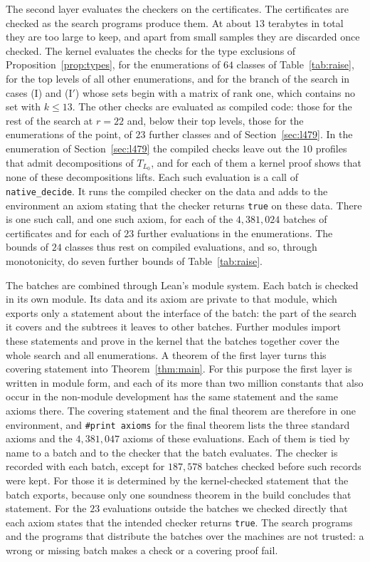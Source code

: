 \documentclass[11pt]{amsart}
\theoremstyle{definition}
\theoremstyle{remark}
\numberwithin{equation}{section}
\begin{document}
The second layer evaluates the checkers on the certificates. The certificates are checked as the search programs produce them. At about $13$ terabytes in total they are too large to keep, and apart from small samples they are discarded once checked. The kernel evaluates the checks for the type exclusions of Proposition~\ref{prop:types}, for the enumerations of $64$ classes of Table~\ref{tab:raise}, for the top levels of all other enumerations, and for the branch of the search in cases (I) and (I$'$) whose sets begin with a matrix of rank one, which contains no set with $k\le 13$. The other checks are evaluated as compiled code: those for the rest of the search at $r=22$ and, below their top levels, those for the enumerations of the point, of $23$ further classes and of Section~\ref{sec:l479}. In the enumeration of Section~\ref{sec:l479} the compiled checks leave out the $10$ profiles that admit decompositions of $T_{L_0}$, and for each of them a kernel proof shows that none of these decompositions lifts. Each such evaluation is a call of \texttt{native\_decide}. It runs the compiled checker on the data and adds to the environment an axiom stating that the checker returns \texttt{true} on these data. There is one such call, and one such axiom, for each of the $4{,}381{,}024$ batches of certificates and for each of $23$ further evaluations in the enumerations. The bounds of $24$ classes thus rest on compiled evaluations, and so, through monotonicity, do seven further bounds of Table~\ref{tab:raise}.

The batches are combined through Lean's module system. Each batch is checked in its own module. Its data and its axiom are private to that module, which exports only a statement about the interface of the batch: the part of the search it covers and the subtrees it leaves to other batches. Further modules import these statements and prove in the kernel that the batches together cover the whole search and all enumerations. A theorem of the first layer turns this covering statement into Theorem~\ref{thm:main}. For this purpose the first layer is written in module form, and each of its more than two million constants that also occur in the non-module development has the same statement and the same axioms there. The covering statement and the final theorem are therefore in one environment, and \texttt{\#print axioms} for the final theorem lists the three standard axioms and the $4{,}381{,}047$ axioms of these evaluations. Each of them is tied by name to a batch and to the checker that the batch evaluates. The checker is recorded with each batch, except for $187{,}578$ batches checked before such records were kept. For those it is determined by the kernel-checked statement that the batch exports, because only one soundness theorem in the build concludes that statement. For the $23$ evaluations outside the batches we checked directly that each axiom states that the intended checker returns \texttt{true}. The search programs and the programs that distribute the batches over the machines are not trusted: a wrong or missing batch makes a check or a covering proof fail.
\end{document}
